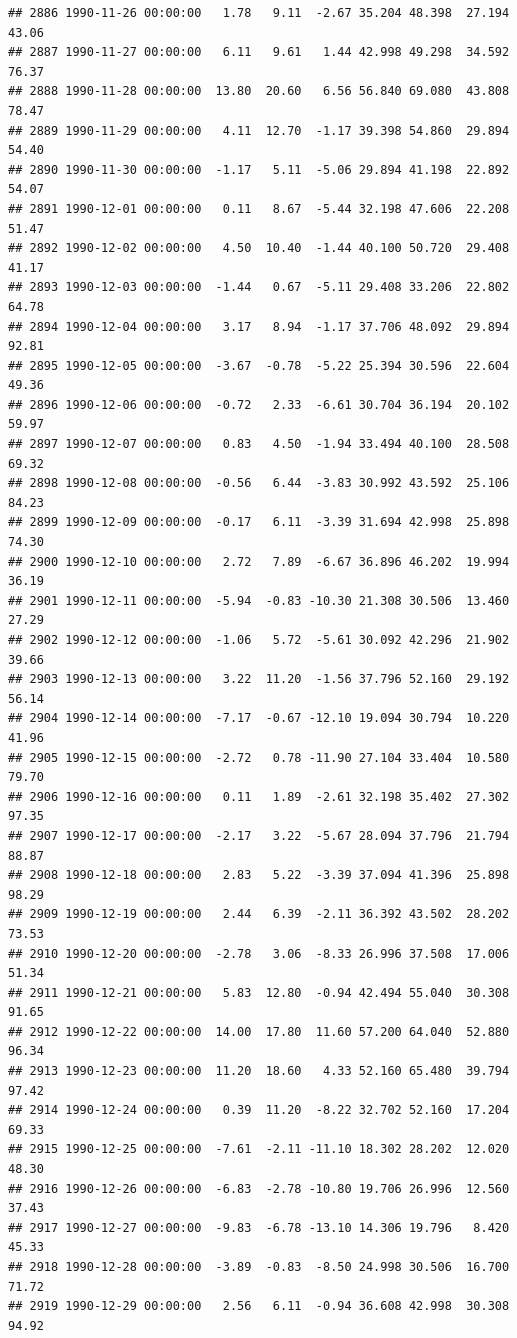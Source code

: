 \documentclass{article}\usepackage{graphicx, color}
\makeatletter
\newenvironment{kframe}{%
 \def\at@end@of@kframe{}%
 \ifinner\ifhmode%
  \def\at@end@of@kframe{\end{minipage}}%
  \begin{minipage}{\columnwidth}%
 \fi\fi%
 \def\FrameCommand##1{\hskip\@totalleftmargin \hskip-\fboxsep
 \colorbox{shadecolor}{##1}\hskip-\fboxsep
     \hskip-\linewidth \hskip-\@totalleftmargin \hskip\columnwidth}%
 \MakeFramed {\advance\hsize-\width
   \@totalleftmargin\z@ \linewidth\hsize
   \@setminipage}}%
 {\par\unskip\endMakeFramed%
 \at@end@of@kframe}
\newenvironment{knitrout}{}{} %
\makeatother
\begin{document}
\begin{knitrout}
\begin{kframe}
\begin{verbatim}
## 2886 1990-11-26 00:00:00   1.78   9.11  -2.67 35.204 48.398  27.194  43.06
## 2887 1990-11-27 00:00:00   6.11   9.61   1.44 42.998 49.298  34.592  76.37
## 2888 1990-11-28 00:00:00  13.80  20.60   6.56 56.840 69.080  43.808  78.47
## 2889 1990-11-29 00:00:00   4.11  12.70  -1.17 39.398 54.860  29.894  54.40
## 2890 1990-11-30 00:00:00  -1.17   5.11  -5.06 29.894 41.198  22.892  54.07
## 2891 1990-12-01 00:00:00   0.11   8.67  -5.44 32.198 47.606  22.208  51.47
## 2892 1990-12-02 00:00:00   4.50  10.40  -1.44 40.100 50.720  29.408  41.17
## 2893 1990-12-03 00:00:00  -1.44   0.67  -5.11 29.408 33.206  22.802  64.78
## 2894 1990-12-04 00:00:00   3.17   8.94  -1.17 37.706 48.092  29.894  92.81
## 2895 1990-12-05 00:00:00  -3.67  -0.78  -5.22 25.394 30.596  22.604  49.36
## 2896 1990-12-06 00:00:00  -0.72   2.33  -6.61 30.704 36.194  20.102  59.97
## 2897 1990-12-07 00:00:00   0.83   4.50  -1.94 33.494 40.100  28.508  69.32
## 2898 1990-12-08 00:00:00  -0.56   6.44  -3.83 30.992 43.592  25.106  84.23
## 2899 1990-12-09 00:00:00  -0.17   6.11  -3.39 31.694 42.998  25.898  74.30
## 2900 1990-12-10 00:00:00   2.72   7.89  -6.67 36.896 46.202  19.994  36.19
## 2901 1990-12-11 00:00:00  -5.94  -0.83 -10.30 21.308 30.506  13.460  27.29
## 2902 1990-12-12 00:00:00  -1.06   5.72  -5.61 30.092 42.296  21.902  39.66
## 2903 1990-12-13 00:00:00   3.22  11.20  -1.56 37.796 52.160  29.192  56.14
## 2904 1990-12-14 00:00:00  -7.17  -0.67 -12.10 19.094 30.794  10.220  41.96
## 2905 1990-12-15 00:00:00  -2.72   0.78 -11.90 27.104 33.404  10.580  79.70
## 2906 1990-12-16 00:00:00   0.11   1.89  -2.61 32.198 35.402  27.302  97.35
## 2907 1990-12-17 00:00:00  -2.17   3.22  -5.67 28.094 37.796  21.794  88.87
## 2908 1990-12-18 00:00:00   2.83   5.22  -3.39 37.094 41.396  25.898  98.29
## 2909 1990-12-19 00:00:00   2.44   6.39  -2.11 36.392 43.502  28.202  73.53
## 2910 1990-12-20 00:00:00  -2.78   3.06  -8.33 26.996 37.508  17.006  51.34
## 2911 1990-12-21 00:00:00   5.83  12.80  -0.94 42.494 55.040  30.308  91.65
## 2912 1990-12-22 00:00:00  14.00  17.80  11.60 57.200 64.040  52.880  96.34
## 2913 1990-12-23 00:00:00  11.20  18.60   4.33 52.160 65.480  39.794  97.42
## 2914 1990-12-24 00:00:00   0.39  11.20  -8.22 32.702 52.160  17.204  69.33
## 2915 1990-12-25 00:00:00  -7.61  -2.11 -11.10 18.302 28.202  12.020  48.30
## 2916 1990-12-26 00:00:00  -6.83  -2.78 -10.80 19.706 26.996  12.560  37.43
## 2917 1990-12-27 00:00:00  -9.83  -6.78 -13.10 14.306 19.796   8.420  45.33
## 2918 1990-12-28 00:00:00  -3.89  -0.83  -8.50 24.998 30.506  16.700  71.72
## 2919 1990-12-29 00:00:00   2.56   6.11  -0.94 36.608 42.998  30.308  94.92

\end{verbatim}
\end{kframe}
\end{knitrout}
\end{document}
